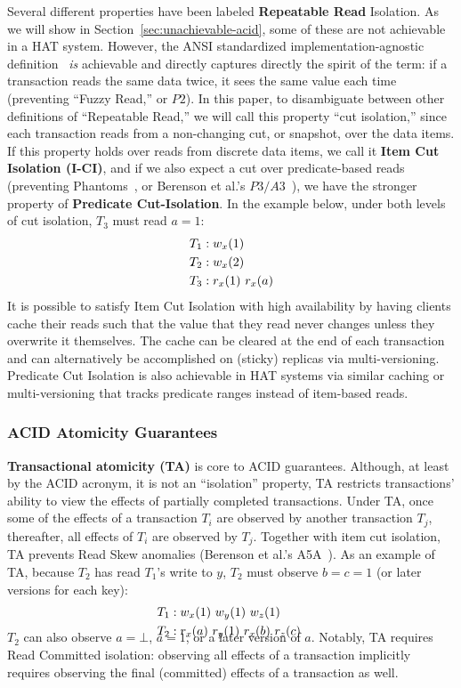 Several different properties have been labeled \textbf{Repeatable
  Read} Isolation. As we will show in
Section~\ref{sec:unachievable-acid}, some of these are not achievable
in a HAT system. However, the ANSI standardized
implementation-agnostic definition~\cite{ansi-sql} \textit{is}
achievable and directly captures directly the spirit of the term: if a
transaction reads the same data twice, it sees the same value each
time (preventing ``Fuzzy Read,'' or $P2$). In this paper, to
disambiguate between other definitions of ``Repeatable Read,'' we will
call this property ``cut isolation,'' since each transaction reads
from a non-changing cut, or snapshot, over the data items. If this
property holds over reads from discrete data items, we call it
\textbf{Item Cut Isolation (I-CI)}, and if we also expect a cut over
predicate-based reads (preventing Phantoms~\cite{gray-isolation}, or
Berenson et al.'s $P3/A3$~\cite{ansicritique}), we have the stronger
property of \textbf{Predicate Cut-Isolation}. In the example below,
under both levels of cut isolation, $T_3$ must read $a=1$:
\begin{align*}
\small
T_1 &: w_x(1)
\\T_2 &: w_x(2)
\\T_3 &: r_x(1)~r_x(a)
\end{align*}
It is possible to satisfy Item Cut Isolation with high availability by
having clients cache their reads such that the value that they read
never changes unless they overwrite it themselves. The cache can be
cleared at the end of each transaction and can alternatively be
accomplished on (sticky) replicas via multi-versioning. Predicate Cut
Isolation is also achievable in HAT systems via similar caching or
multi-versioning that tracks predicate ranges instead of item-based
reads.

\subsubsection{ACID Atomicity Guarantees}

\textbf{Transactional atomicity (TA)} is core to ACID guarantees. Although, at
least by the ACID acronym, it is not an ``isolation'' property, TA
restricts transactions' ability to view the effects of partially
completed transactions. Under TA, once some of the effects of a
transaction $T_i$ are observed by another transaction $T_j$,
thereafter, all effects of $T_i$ are observed by $T_j$. Together with
item cut isolation, TA prevents Read Skew anomalies (Berenson et al.'s
A5A~\cite{ansicritique}). As an example of TA, because $T_2$ has read
$T_1$'s write to $y$, $T_2$ must observe $b=c=1$ (or later versions
for each key):
\vspace{-1em}
\begin{align*}
\small
T_1 &: w_x(1)~w_y(1)~w_z(1)
\\T_2 &: r_x(a)~r_y(1)~r_x(b)~r_z(c)~\\[-1.5em]
\end{align*}
$T_2$ can also observe $a=\bot$, $a=1$, or a later version of
$a$. Notably, TA requires Read Committed isolation: observing all
effects of a transaction implicitly requires observing the final
(committed) effects of a transaction as well.


